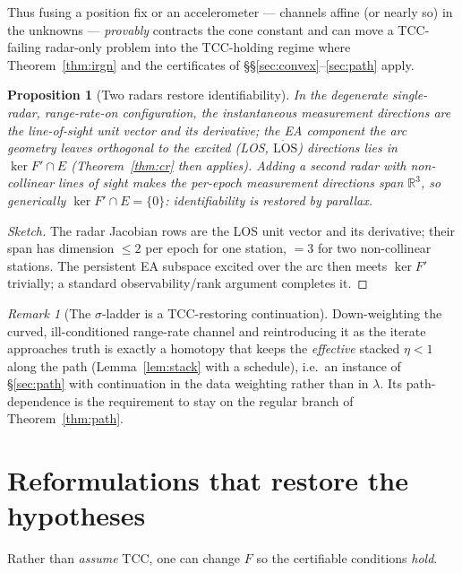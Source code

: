 \documentclass[11pt]{article}
\theoremstyle{plain}
\newtheorem{proposition}[theorem]{Proposition}
\theoremstyle{definition}
\theoremstyle{remark}
\newtheorem*{remark}{Remark}
\newcommand{\R}{\mathbb{R}}
\begin{document}
Thus fusing a position fix or an accelerometer --- channels affine (or
nearly so) in the unknowns --- \emph{provably} contracts the cone
constant and can move a TCC-failing radar-only problem into the
TCC-holding regime where Theorem~\ref{thm:irgn} and the certificates of
\S\S\ref{sec:convex}--\ref{sec:path} apply.

\begin{proposition}[Two radars restore identifiability]\label{prop:tworad}
In the degenerate single-radar, range-rate-on configuration, the
instantaneous measurement directions are the line-of-sight unit vector
and its derivative; the EA component the arc geometry leaves orthogonal
to the excited \textup{(LOS, $\dot{\text{LOS}}$)} directions lies in
$\ker F'\cap E$ (Theorem~\ref{thm:cr} then applies). Adding a second
radar with non-collinear lines of sight makes the per-epoch measurement
directions span $\R^{3}$, so generically $\ker F'\cap E=\{0\}$:
identifiability is restored by parallax.
\end{proposition}
\begin{proof}[Sketch]
The radar Jacobian rows are the LOS unit vector and its derivative; their
span has dimension $\le2$ per epoch for one station, $=3$ for two
non-collinear stations. The persistent EA subspace excited over the arc
then meets $\ker F'$ trivially; a standard observability/rank argument
\cite{walter1997} completes it.
\end{proof}

\begin{remark}[The $\sigma$-ladder is a TCC-restoring continuation]
Down-weighting the curved, ill-conditioned range-rate channel and
reintroducing it as the iterate approaches truth is exactly a homotopy
that keeps the \emph{effective} stacked $\eta<1$ along the path
(Lemma~\ref{lem:stack} with a schedule), i.e.\ an instance of
\S\ref{sec:path} with continuation in the data weighting rather than in
$\lambda$. Its path-dependence is the requirement to stay on the regular
branch of Theorem~\ref{thm:path}.
\end{remark}

\section{Reformulations that restore the hypotheses}\label{sec:reform}

Rather than \emph{assume} TCC, one can change $F$ so the certifiable
conditions \emph{hold}.
\end{document}
